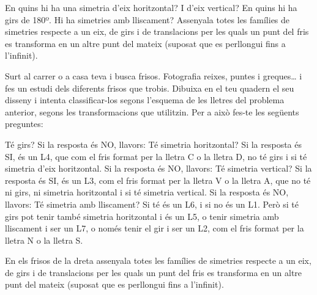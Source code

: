 \begin{mylist}
\begin{tasks}
	\task  En quins hi ha una simetria d'eix horitzontal?  I d'eix vertical?     
	\task  En quins hi ha girs de 180º.   
	\task  Hi ha simetries amb lliscament?
	\task  Assenyala totes les famílies de simetries respecte a un eix, de girs i de translacions per les quals un punt del fris es transforma en un altre punt del mateix (suposat que es perllongui fins a l'infinit).
\end{tasks}



\exer \simbolsearch Surt al carrer o a casa teva i busca frisos. Fotografia reixes, puntes i greques{\dots} i fes un estudi dels diferents frisos que trobis. Dibuixa en el teu quadern el seu disseny i intenta classificar-los segons l'esquema de les lletres del problema anterior, segons les transformacions que utilitzin. Per a això fes-te les següents preguntes:

\begin{tasks}
\task Té girs? Si la resposta és NO, llavors:
%
\task Té simetria horitzontal? Si la resposta és SI, és un L4, que com el fris format per la lletra C o la lletra D, no té girs i si té simetria d'eix horitzontal. Si la resposta és NO, llavors:
%
\task Té simetria vertical? Si la resposta és SI, és un L3, com el fris format per la lletra V o la lletra A, que no té ni girs, ni simetria horitzontal i si té simetria vertical. Si la resposta és NO, llavors:
%
\task Té simetria amb lliscament? Si té és un L6, i si no és un L1. Però si té girs pot tenir també simetria horitzontal i és un L5, o tenir simetria amb lliscament i ser un L7, o només tenir el gir i ser un L2, com el fris format per la lletra N o la lletra S. 
 \end{tasks}


\exer  En els frisos de la dreta assenyala totes les famílies de simetries respecte a un eix, de girs i de translacions per les quals un punt del fris es transforma en un altre punt del mateix (suposat que es perllongui fins a l'infinit).


\end{mylist}
